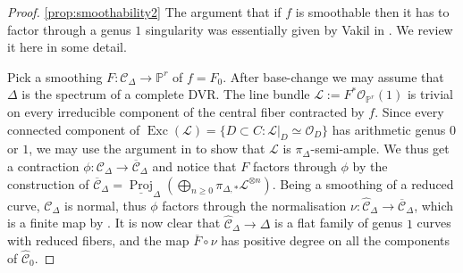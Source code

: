 \documentclass[11pt]{amsart}
\newcommand{\PP}{\mathbb P}
\newcommand{\OO}{\mathcal O}
\renewcommand{\to}{\rightarrow}
\newcommand{\cC}{\mathcal C}
\newcommand{\hC}{\widehat{\mathcal C}}
\newcommand{\dvr}{\Delta}
\theoremstyle{plain}
\theoremstyle{definition}
\begin{document}
\begin{proof}\ref{prop:smoothability2}
 The argument that if $f$ is smoothable then it has to factor through a genus $1$ singularity was essentially given by Vakil in \cite[Lemma 5.9]{Vre}. We review it here in some detail.
 
 Pick a smoothing $F\colon\cC_{\dvr}\to \PP^r$ of $f=F_0$. After base-change we may assume that $\dvr$ is the spectrum of a complete DVR. The line bundle $\mathcal L:=F^*\OO_{\PP^r}(1)$ is trivial on every irreducible component of the central fiber contracted by $f$.  Since every connected component of $\operatorname{Exc}(\mathcal L)=\{D\subset C : \mathcal{L}\rvert_D\simeq \OO_D\}$ has arithmetic genus $0$ or $1$, we may use the argument in \cite[Lemma 2.12]{SMY1} to show that $\mathcal L$ is $\pi_{\dvr}$-semi-ample. We thus get a contraction $\phi\colon \cC_{\dvr}\to \overline{\cC}_{\dvr}$ and notice that $F$ factors through $\phi$ by the construction of $\overline{\cC}_{\dvr}=\underline{\operatorname{Proj}}_{\dvr}\left(\bigoplus_{n\geq 0}\pi_{\dvr,*}\mathcal L^{\otimes n}\right)$.
 Being a smoothing of a reduced curve, $\cC_{\dvr}$ is normal, thus $\phi$ factors through the normalisation $\nu\colon \hC_{\dvr}\to \overline{\cC}_{\dvr}$, which is a finite map by \cite[\S 8.2]{Liusbook}. It is now clear that $\hC_{\dvr}\to\dvr$ is a flat family of genus $1$ curves with reduced fibers, and the map $\overline{F}\circ\nu$ has positive degree on all the components of $\hC_0$.
 
 
 

\end{proof}
\end{document}
